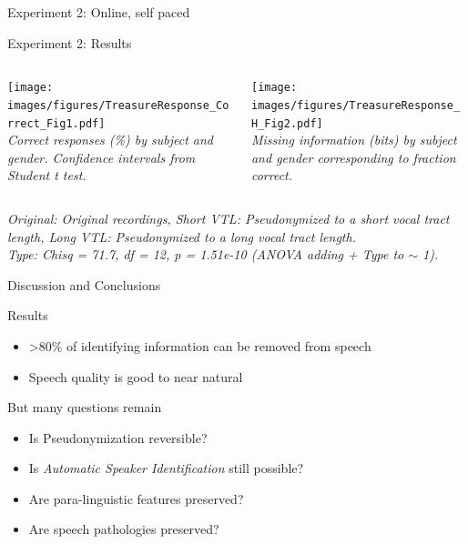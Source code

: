 \documentclass[xcolor={dvipsnames}]{beamer}
\begin{document}
\begin{frame}{Experiment 2: Online, self paced}
\let\thefootnote\relax{}
\end{frame}

\begin{frame}{Experiment 2: Results}
    \begin{columns}
        \centering
        \begin{column}{0.48\textwidth}
        \texttt{[image: images/figures/TreasureResponse\_Correct\_Fig1.pdf]} \\
        \scriptsize{\textit{Correct responses (\%) by subject and gender.
        Confidence intervals from Student t test.}}
        \end{column}
        \begin{column}{0.48\textwidth}
        \texttt{[image: images/figures/TreasureResponse\_H\_Fig2.pdf]}\\
        \scriptsize{\textit{Missing information (bits) by subject and gender corresponding to fraction correct.}}

        \end{column}
    \end{columns}
    \vskip 0.8cm
    \scriptsize{\textit{Original: Original recordings, Short VTL: Pseudonymized to a short vocal tract length, Long VTL: Pseudonymized to a long vocal tract length.\\
Type: Chisq = 71.7, df = 12, p = 1.51e-10 (ANOVA adding + Type to $\sim$ 1).}}
\end{frame}

\begin{frame}{Discussion and Conclusions}

\begin{block}{Results}
\begin{itemize}
    \item >80\% of identifying information can be removed from speech
    \item Speech quality is good to near natural
\end{itemize}
\end{block}
 \begin{block}{But many questions remain}
\begin{itemize}
    \item Is Pseudonymization reversible?
    \item Is {\em Automatic Speaker Identification} still possible?
    \item Are para-linguistic features preserved?
    \item Are speech pathologies preserved?
\end{itemize}
\end{block}

\end{frame}
\end{document}
